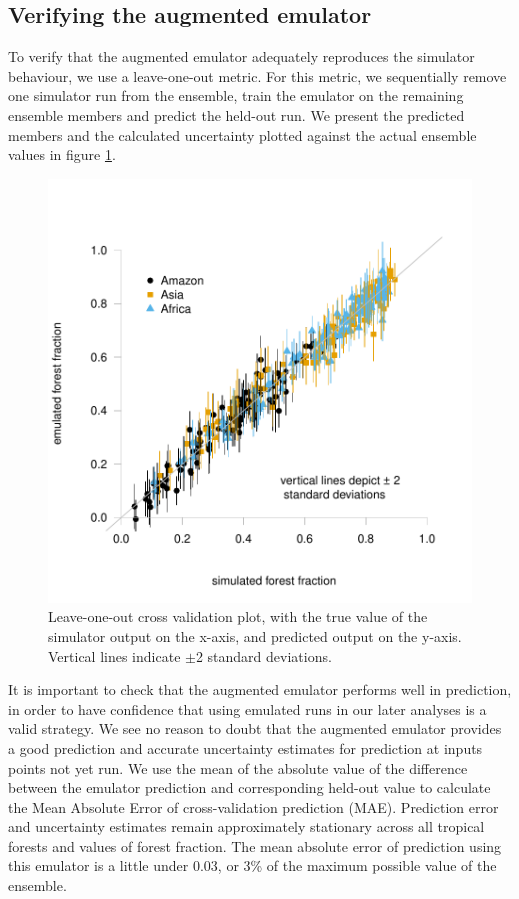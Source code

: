 \documentclass[gmd, manuscript]{copernicus}
\begin{document}
\subsection{Verifying the augmented emulator}\label{ssec:verifying}
To verify that the augmented emulator adequately reproduces the simulator behaviour, we use a leave-one-out metric. For this metric, we sequentially remove one simulator run from the ensemble, train the emulator on the remaining ensemble members and predict the held-out run. We present the predicted members and the calculated uncertainty plotted against the actual ensemble values in figure \ref{fig:true_loo_all}.

\begin{figure}[t]
\includegraphics[width=12cm]{../graphics/true_loo_all.pdf}
\caption{Leave-one-out cross validation plot, with the true value of the simulator output on the x-axis, and predicted output on the y-axis. Vertical lines indicate $\pm$2 standard deviations.
}
\label{fig:true_loo_all}
\end{figure}

It is important to check that the augmented emulator performs well in prediction, in order to have confidence that using emulated runs in our later analyses is a valid strategy. We see no reason to doubt that the augmented emulator provides a good prediction and accurate uncertainty estimates for prediction at inputs points not yet run. We use the mean of the absolute value of the difference between the emulator prediction and corresponding held-out value to calculate the Mean Absolute Error of cross-validation prediction (MAE). Prediction error and uncertainty estimates remain approximately stationary across all tropical forests and values of forest fraction. The mean absolute error of prediction using this emulator is a little under 0.03, or 3\% of the maximum possible value of the ensemble.
\end{document}
